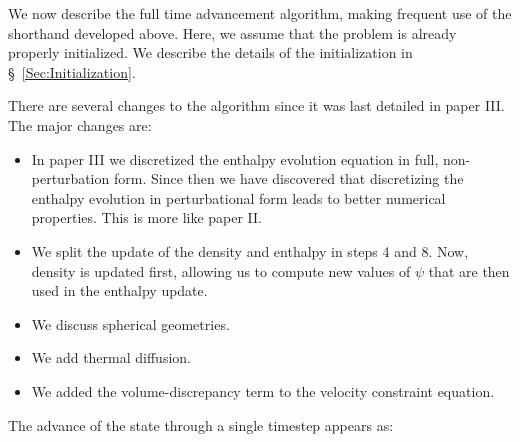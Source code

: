 We now describe the full time advancement algorithm, making frequent
use of the shorthand developed above.  Here, we assume that the
problem is already properly initialized.  We describe the details of
the initialization in \S~\ref{Sec:Initialization}.

There are several changes to the algorithm since it was last detailed
in paper III.  The major changes are:
\begin{itemize}
\item In paper III we discretized the enthalpy evolution equation in
full, non-perturbation form.  Since then we have discovered that 
discretizing the enthalpy evolution in perturbational form leads to better
numerical properties.  This is more like paper II.

\item We split the update of the density and enthalpy in steps 4 and 8.
Now, density is updated first, allowing us to compute new values of 
$\psi$ that are then used in the enthalpy update.

\item We discuss spherical geometries.

\item We add thermal diffusion.

\item We added the volume-discrepancy term to the velocity constraint
equation.
\end{itemize}
%
The advance of the state through a single timestep appears as:


